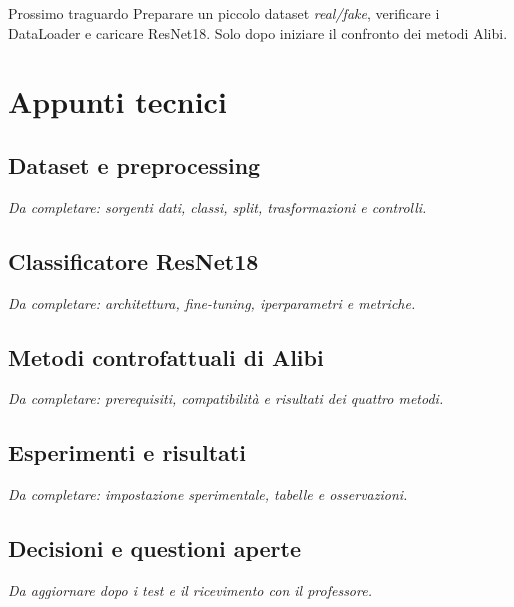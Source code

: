 \documentclass[10pt,a4paper,oneside]{book}
\begin{document}
\begin{importantbox}{Prossimo traguardo}
Preparare un piccolo dataset \textit{real/fake}, verificare i DataLoader
e caricare ResNet18. Solo dopo iniziare il confronto dei metodi Alibi.
\end{importantbox}

\chapter{Appunti tecnici}


\section{Dataset e preprocessing}
\textit{Da completare: sorgenti dati, classi, split, trasformazioni e controlli.}

\section{Classificatore ResNet18}
\textit{Da completare: architettura, fine-tuning, iperparametri e metriche.}

\section{Metodi controfattuali di Alibi}
\textit{Da completare: prerequisiti, compatibilità e risultati dei quattro metodi.}

\section{Esperimenti e risultati}
\textit{Da completare: impostazione sperimentale, tabelle e osservazioni.}

\section{Decisioni e questioni aperte}
\textit{Da aggiornare dopo i test e il ricevimento con il professore.}
\end{document}
